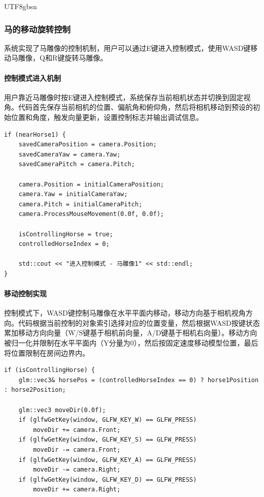 \documentclass{article}
\begin{document}
\begin{CJK}{UTF8}{gbsn}
\subsubsection{马的移动旋转控制}
系统实现了马雕像的控制机制，用户可以通过E键进入控制模式，使用WASD键移动马雕像，Q和R键旋转马雕像。

\paragraph{控制模式进入机制}
用户靠近马雕像时按E键进入控制模式，系统保存当前相机状态并切换到固定视角。代码首先保存当前相机的位置、偏航角和俯仰角，然后将相机移动到预设的初始位置和角度，触发向量更新，设置控制标志并输出调试信息。

\begin{lstlisting}[caption=控制模式进入代码]
if (nearHorse1) {
    savedCameraPosition = camera.Position;
    savedCameraYaw = camera.Yaw;
    savedCameraPitch = camera.Pitch;
    
    camera.Position = initialCameraPosition;
    camera.Yaw = initialCameraYaw;
    camera.Pitch = initialCameraPitch;
    camera.ProcessMouseMovement(0.0f, 0.0f);
    
    isControllingHorse = true;
    controlledHorseIndex = 0;
    
    std::cout << "进入控制模式 - 马雕像1" << std::endl;
}
\end{lstlisting}

\paragraph{移动控制实现}
控制模式下，WASD键控制马雕像在水平平面内移动，移动方向基于相机视角方向。代码根据当前控制的对象索引选择对应的位置变量，然后根据WASD按键状态累加移动方向向量（W/S键基于相机前向量，A/D键基于相机右向量）。移动方向被归一化并限制在水平平面内（Y分量为0），然后按固定速度移动模型位置，最后将位置限制在房间边界内。

\begin{lstlisting}[caption=马的移动控制代码]
if (isControllingHorse) {
    glm::vec3& horsePos = (controlledHorseIndex == 0) ? horse1Position : horse2Position;
    
    glm::vec3 moveDir(0.0f);
    if (glfwGetKey(window, GLFW_KEY_W) == GLFW_PRESS)
        moveDir += camera.Front;
    if (glfwGetKey(window, GLFW_KEY_S) == GLFW_PRESS)
        moveDir -= camera.Front;
    if (glfwGetKey(window, GLFW_KEY_A) == GLFW_PRESS)
        moveDir -= camera.Right;
    if (glfwGetKey(window, GLFW_KEY_D) == GLFW_PRESS)
        moveDir += camera.Right;
    

\end{lstlisting}
\end{CJK}
\end{document}
